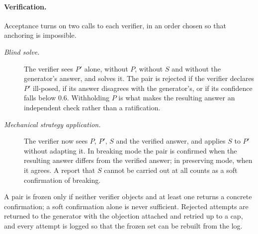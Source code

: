 \documentclass[letterpaper]{article} %
\begin{document}
\paragraph{Verification.}
Acceptance turns on two calls to each verifier, in an order chosen so that
anchoring is impossible.

\begin{description}
\item[\textnormal{\emph{Blind solve.}}] The verifier sees $P'$ alone, without
  $P$, without $S$ and without the generator's answer, and solves it. The pair is
  rejected if the verifier declares $P'$ ill-posed, if its answer disagrees
  with the generator's, or if its confidence falls below $0.6$. Withholding $P$
  is what makes the resulting answer an independent check rather than a
  ratification.
\item[\textnormal{\emph{Mechanical strategy application.}}] The verifier now
  sees $P$, $P'$, $S$ and the verified answer, and applies $S$ to $P'$ without
  adapting it. In breaking mode the pair is confirmed when the resulting answer
  differs from the verified answer; in preserving mode, when it agrees. A
  report that $S$ cannot be carried out at all counts as a soft confirmation of
  breaking.
\end{description}

A pair is frozen only if neither verifier objects and at least one returns a
concrete confirmation; a soft confirmation alone is never sufficient. Rejected
attempts are returned to the generator with the objection attached and retried
up to a cap, and every attempt is logged so that the frozen set can be rebuilt
from the log.
\end{document}

